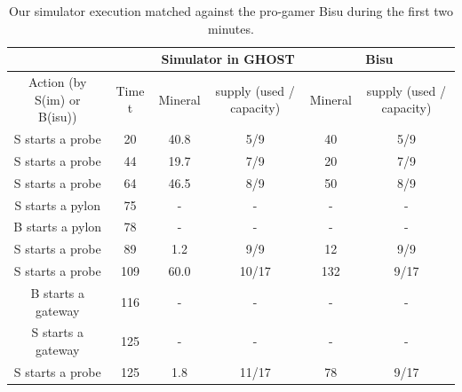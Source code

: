 \documentclass{article}
\newcommand{\ghost}{\textsc{GHOST}\xspace}
\begin{document}
\begin{table}[ht]
  \caption{Our simulator execution matched  against the pro-gamer Bisu
    during the first two minutes.}
  \label{tab:korean}
  \centering
  \begin{tabular}{|c|c|c|c|c|c|} 
    \cline{3-6}
    \multicolumn{2}{c|}{} & \multicolumn{2}{c|}{Simulator in \ghost} & \multicolumn{2}{c|}{Bisu}\\ 
    \hline
    Action (by S(im) or B(isu)) & Time t & \multicolumn{1}{c|}{Mineral} & \multicolumn{1}{c|}{supply (used / capacity)} & \multicolumn{1}{c|}{Mineral} & \multicolumn{1}{c|}{supply (used / capacity)}\\
    \hline
    S starts a probe & 20 & 40.8 & 5/9 & 40 & 5/9\\
    S starts a probe & 44 & 19.7 & 7/9 & 20 & 7/9\\
    S starts a probe & 64 & 46.5 & 8/9 & 50 & 8/9\\
    S starts a pylon & 75 & - & - & - & -\\
    B starts a pylon & 78 & - & - & - & -\\
    S starts a probe & 89 & 1.2 & 9/9 & 12 & 9/9\\
    S starts a probe & 109 & 60.0 & 10/17 & 132 & 9/17\\
    B starts a gateway & 116 & - & - & - & -\\
    S starts a gateway & 125 & - & - & - & -\\
    S starts a probe & 125 & 1.8 & 11/17 & 78 & 9/17\\
    \hline    
  \end{tabular}
\end{table}
\end{document}
